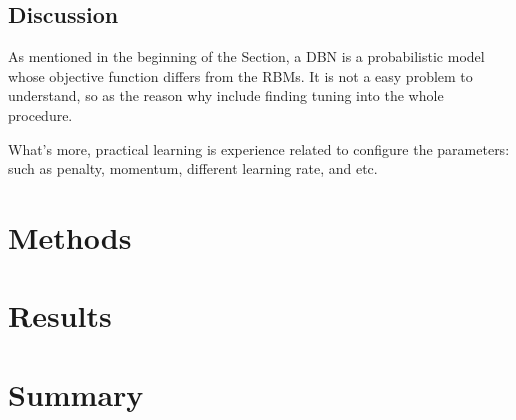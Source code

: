 	\subsection{Discussion}
		As mentioned in the beginning of the Section, a DBN is a probabilistic model whose objective function differs from the RBMs.
		It is not a easy problem to understand, so as the reason why include finding tuning into the whole procedure.
	
	
		What's more, practical learning is experience related to configure the parameters: such as penalty, momentum, different learning rate, and etc.
\section{Methods}
\section{Results}
\section{Summary}